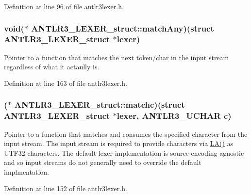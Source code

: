 Definition at line 96 of file antlr3lexer.\-h.

\hypertarget{struct_a_n_t_l_r3___l_e_x_e_r__struct_ade2cead2bc3a6d5693b38e77542f8149}{
\subsubsection[{match\-Any}]{\setlength{\rightskip}{0pt plus 5cm}void($\ast$ A\-N\-T\-L\-R3\-\_\-\-L\-E\-X\-E\-R\-\_\-struct\-::match\-Any)(struct {\bf A\-N\-T\-L\-R3\-\_\-\-L\-E\-X\-E\-R\-\_\-struct} $\ast$lexer)}}\label{struct_a_n_t_l_r3___l_e_x_e_r__struct_ade2cead2bc3a6d5693b38e77542f8149}
Pointer to a function that matches the next token/char in the input stream regardless of what it actaully is. 

Definition at line 163 of file antlr3lexer.\-h.

\hypertarget{struct_a_n_t_l_r3___l_e_x_e_r__struct_ae3c5c1856e94f840c9c1872f8617b282}{
\subsubsection[{matchc}]{($\ast$ A\-N\-T\-L\-R3\-\_\-\-L\-E\-X\-E\-R\-\_\-struct\-::matchc)(struct {\bf A\-N\-T\-L\-R3\-\_\-\-L\-E\-X\-E\-R\-\_\-struct} $\ast$lexer, {\bf A\-N\-T\-L\-R3\-\_\-\-U\-C\-H\-A\-R} {\bf c})}}\label{struct_a_n_t_l_r3___l_e_x_e_r__struct_ae3c5c1856e94f840c9c1872f8617b282}
Pointer to a function that matches and consumes the specified character from the input stream. The input stream is required to provide characters via \hyperlink{cif_lexer_8cpp_a04f118c7e17dd264e56efa7f7a3b6b6f}{L\-A()} as U\-T\-F32 characters. The default lexer implementation is source encoding agnostic and so input streams do not generally need to override the default implmentation. 

Definition at line 152 of file antlr3lexer.\-h.

